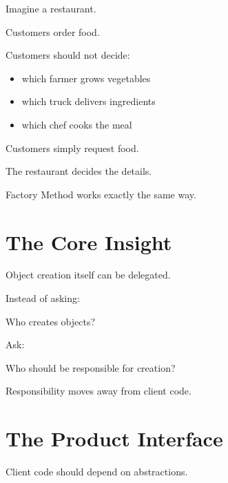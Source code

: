 \documentclass[11pt,a4paper]{book}
\begin{document}
\begin{mentalmodel}

Imagine a restaurant.

Customers order food.

Customers should not decide:

\begin{itemize}

\item which farmer grows vegetables
\item which truck delivers ingredients
\item which chef cooks the meal

\end{itemize}

Customers simply request food.

The restaurant decides the details.

Factory Method works exactly the same way.

\end{mentalmodel}


\section{The Core Insight}

\begin{idea}

Object creation itself can be delegated.

Instead of asking:

\begin{center}
Who creates objects?
\end{center}

Ask:

\begin{center}
Who should be responsible for creation?
\end{center}

\end{idea}

Responsibility moves away from client code.


\section{The Product Interface}

Client code should depend on abstractions.
\end{document}
